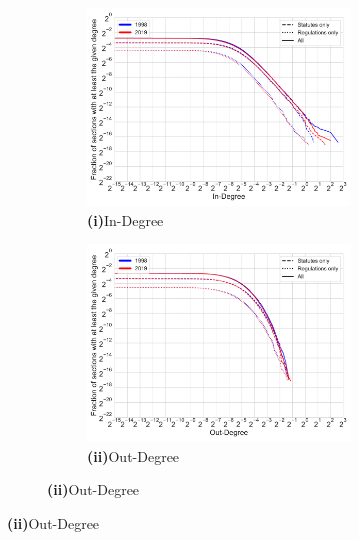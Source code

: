 \documentclass[varwidth, border=0pt]{standalone}
\begin{document}
\begin{figure}
\vspace*{6pt}

\begin{subfigure}{\linewidth}
	\begin{multicols}{2}
		\centering
		\begin{subfigure}{\linewidth}
			\includegraphics[width=\linewidth]{../../graphics/in-degree-de-1998-2019-normalized.pdf}
			\caption*{\textbf{\textsf{(i)}}\quad In-Degree}
		\end{subfigure}
		\newpage
		\begin{subfigure}{\linewidth}
			\includegraphics[width=\linewidth]{../../graphics/out-degree-de-1998-2019-normalized.pdf}
			\caption*{\textbf{\textsf{(ii)}}\quad Out-Degree}
		\end{subfigure}	
	\end{multicols}
	\vspace*{-6pt}
\end{subfigure}
	\end{figure}
	
\end{document}
